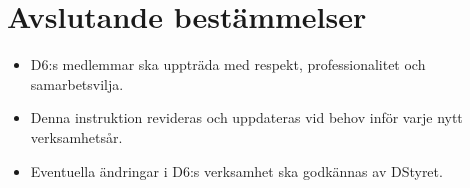\documentclass[a4paper]{dtekinstruktion}
\begin{document}
\section{Avslutande bestämmelser}
\begin{itemize}
  \item D6:s medlemmar ska uppträda med respekt, professionalitet och samarbetsvilja.
  \item Denna instruktion revideras och uppdateras vid behov inför varje nytt verksamhetsår.
  \item Eventuella ändringar i D6:s verksamhet ska godkännas av DStyret.
\end{itemize}
\end{document}
